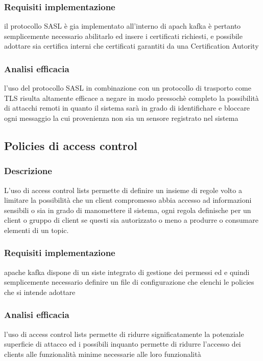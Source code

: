 \documentclass[10pt]{article}
\begin{document}
        \subsubsection{Requisiti implementazione}
        il protocollo SASL è gia implementato all'interno di apach kafka è pertanto semplicemente necessario abilitarlo ed insere i certificati richiesti,
        e possibile adottare sia certifica interni che certificati garantiti da una Certification Autority
        \subsubsection{Analisi efficacia}
        l'uso del protocollo SASL in combinazione con un protocollo di trasporto come TLS risulta altamente efficace a negare in modo pressochè completo la possibilità di attacchi remoti
        in quanto il sistema sarà in grado di identifichare e bloccare ogni messaggio la cui provenienza non sia un sensore registrato nel sistema
    \subsection{Policies di access control}
        \subsubsection{Descrizione}
        L'uso di access control lists permette di definire un insieme di regole volto a limitare la possibilità che un client compromesso abbia accesso ad informazioni sensibili o sia in grado di manomettere il sistema,
        ogni regola definische per un client o gruppo di client se questi sia autorizzato o meno a produrre o consumare elementi di un topic.
        \subsubsection{Requisiti implementazione}
        apache kafka dispone di un siste integrato di gestione dei permessi ed e quindi semplicemente necessario definire un file di configurazione che elenchi le policies che si intende adottare
        \subsubsection{Analisi efficacia}
        l'uso di access control lists permette di ridurre significatamente la potenziale superficie di attacco ed i possibili inquanto permette di ridurre l'accesso dei clients alle funzionalità minime necessarie alle loro funzionalità
\end{document}
